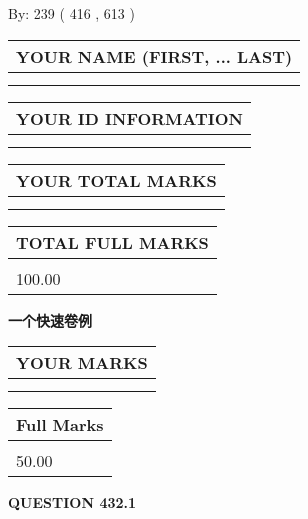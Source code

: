 \documentclass{ctexart}
\begin{document}
   
\hspace{1.0in} By: 
 239 ( 416 ,  613 )
   
   
   
   
\newpage 
\setcounter{page}{ 
   432001 } 
   
   
   
   
\noindent\begin{tabular}{|l|}
\hline
YOUR NAME (FIRST, ... LAST)  \\
\hline
 \\ 
 \\ 
\hline
\end{tabular}
\hspace{0.05in} \begin{tabular}{|l|}
\hline
 YOUR   ID   INFORMATION  \\
\hline
 \\ 
 \\ 
\hline
\end{tabular}
   
   
\vspace{0.2in}\noindent\begin{tabular}{|l|}
\hline
YOUR TOTAL MARKS  \\
\hline
 \\ 
 \\ 
\hline
\end{tabular}
\hspace{0.05in} \begin{tabular}{|l|}
\hline
TOTAL FULL MARKS  \\
\hline
 \\ 
100.00 \\
\hline
\end{tabular}
   
   
 \vspace{0.2in}
{\LARGE {\textbf{ 一个快速卷例}}}
   
   
  
\vspace{0.2in}
  
\noindent\begin{tabular}{|l|}
\hline
 YOUR MARKS  \\
\hline
 \\ 
 \\ 
\hline
\end{tabular}
\hspace{0.05in} \begin{tabular}{|l|}
\hline
 Full Marks  \\
\hline
 \\ 
50.00 \\
\hline
\end{tabular}
{\textbf{\Large{QUESTION
432.1 
}}}
  
\end{document}
